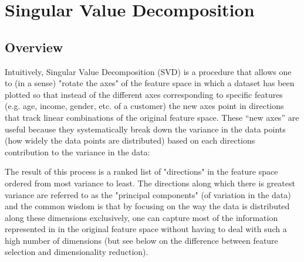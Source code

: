 \documentclass{article}
\begin{document}
\section{Singular Value Decomposition}
\subsection{Overview}
Intuitively, Singular Value Decomposition (SVD) is a procedure that allows one to (in a sense) "rotate the axes" of the feature space in which a dataset has been plotted so that instead of the different axes corresponding to specific features (e.g. age, income, gender, etc. of a customer) the new axes point in directions that track linear combinations of the original feature space.  These “new axes” are useful because they systematically break down the variance in the data points (how widely the data points are distributed) based on each directions contribution to the variance in the data:

% 
% 

The result of this process is a ranked list of "directions" in the feature space ordered from most variance to least.  The directions along which there is greatest variance are referred to as the "principal components" (of variation in the data) and the common wisdom is that by focusing on the way the data is distributed along these dimensions exclusively, one can capture most of the information represented in in the original feature space without having to deal with such a high number of dimensions (but see below on the difference between feature selection and dimensionality reduction).
\end{document}
